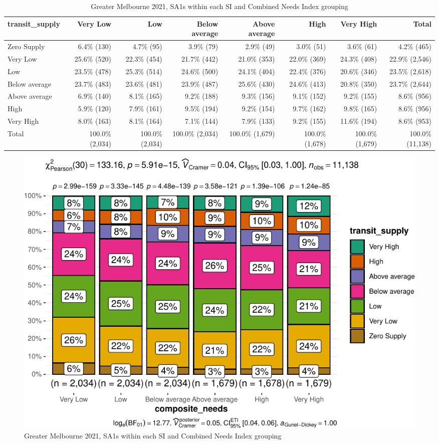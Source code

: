\documentclass[preprint, 3p,
authoryear]{elsarticle} %
\begin{document}
\begin{longtable}[t]{lrrrrrrr}
\caption{\label{tab:Greater_Melbourne_2021_needs_gap_zones}Greater Melbourne 2021, SA1s within each SI and Combined Needs Index grouping}\\
\toprule
transit\_supply & Very Low & Low & Below average & Above average & High & Very High & Total\\
\midrule
Zero Supply & 6.4\%   (130) & 4.7\%    (95) & 3.9\%    (79) & 2.9\%    (49) & 3.0\%    (51) & 3.6\%    (61) & 4.2\%    (465)\\
Very Low & 25.6\%   (520) & 22.3\%   (454) & 21.7\%   (442) & 21.0\%   (353) & 22.0\%   (369) & 24.3\%   (408) & 22.9\%  (2,546)\\
Low & 23.5\%   (478) & 25.3\%   (514) & 24.6\%   (500) & 24.1\%   (404) & 22.4\%   (376) & 20.6\%   (346) & 23.5\%  (2,618)\\
Below average & 23.7\%   (483) & 23.6\%   (481) & 23.9\%   (487) & 25.6\%   (430) & 24.6\%   (413) & 20.8\%   (350) & 23.7\%  (2,644)\\
Above average & 6.9\%   (140) & 8.1\%   (165) & 9.2\%   (188) & 9.3\%   (156) & 9.1\%   (152) & 9.2\%   (155) & 8.6\%    (956)\\
\addlinespace
High & 5.9\%   (120) & 7.9\%   (161) & 9.5\%   (194) & 9.2\%   (154) & 9.7\%   (162) & 9.8\%   (165) & 8.6\%    (956)\\
Very High & 8.0\%   (163) & 8.1\%   (164) & 7.1\%   (144) & 7.9\%   (133) & 9.2\%   (155) & 11.6\%   (194) & 8.6\%    (953)\\
Total & 100.0\% (2,034) & 100.0\% (2,034) & 100.0\% (2,034) & 100.0\% (1,679) & 100.0\% (1,678) & 100.0\% (1,679) & 100.0\% (11,138)\\
\bottomrule
\end{longtable}
\endgroup{}

\begin{figure}
\centering
\includegraphics{Leveraging_GTFS_to_assess_transit_supply_Transport_Geography_files/figure-latex/Greater_Melbourne_2021_needs_gap_zones-1.pdf}
\caption{Greater Melbourne 2021, SA1s within each SI and Combined Needs
Index grouping}
\end{figure}
\end{document}
